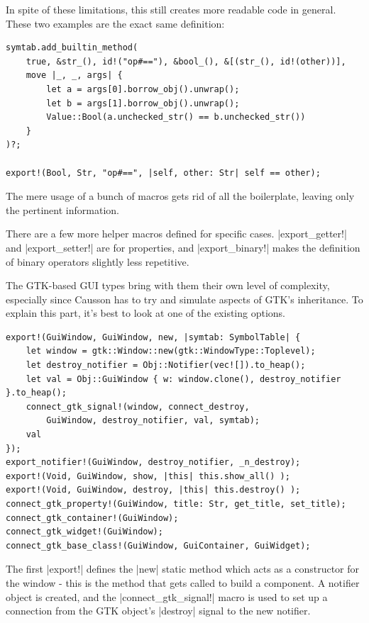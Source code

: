 \documentclass[11pt]{report}
\begin{document}
In spite of these limitations, this still creates more readable code in general. These two examples are the exact same definition:

\begin{verbatim}
symtab.add_builtin_method(
    true, &str_(), id!("op#=="), &bool_(), &[(str_(), id!(other))],
    move |_, _, args| {
        let a = args[0].borrow_obj().unwrap();
        let b = args[1].borrow_obj().unwrap();
        Value::Bool(a.unchecked_str() == b.unchecked_str())
    }
)?;

export!(Bool, Str, "op#==", |self, other: Str| self == other);
\end{verbatim}

The mere usage of a bunch of macros gets rid of all the boilerplate, leaving only the pertinent information.

There are a few more helper macros defined for specific cases. |export_getter!| and |export_setter!| are for properties, and |export_binary!| makes the definition of binary operators slightly less repetitive.

The GTK-based GUI types bring with them their own level of complexity, especially since Causson has to try and simulate aspects of GTK's inheritance. To explain this part, it's best to look at one of the existing options.

\begin{verbatim}
export!(GuiWindow, GuiWindow, new, |symtab: SymbolTable| {
	let window = gtk::Window::new(gtk::WindowType::Toplevel);
	let destroy_notifier = Obj::Notifier(vec![]).to_heap();
	let val = Obj::GuiWindow { w: window.clone(), destroy_notifier }.to_heap();
	connect_gtk_signal!(window, connect_destroy,
	    GuiWindow, destroy_notifier, val, symtab);
	val
});
export_notifier!(GuiWindow, destroy_notifier, _n_destroy);
export!(Void, GuiWindow, show, |this| this.show_all() );
export!(Void, GuiWindow, destroy, |this| this.destroy() );
connect_gtk_property!(GuiWindow, title: Str, get_title, set_title);
connect_gtk_container!(GuiWindow);
connect_gtk_widget!(GuiWindow);
connect_gtk_base_class!(GuiWindow, GuiContainer, GuiWidget);
\end{verbatim}

The first |export!| defines the |new| static method which acts as a constructor for the window - this is the method that gets called to build a component. A notifier object is created, and the |connect_gtk_signal!| macro is used to set up a connection from the GTK object's |destroy| signal to the new notifier.
\end{document}

